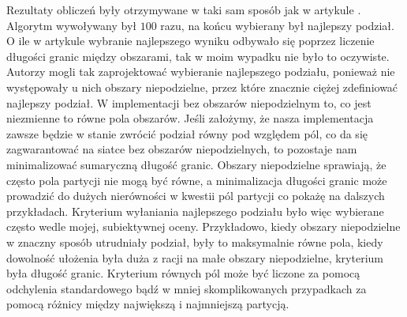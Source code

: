 Rezultaty obliczeń były otrzymywane w taki sam sposób jak w artykule \cite{1364754}.
Algorytm wywoływany był $100$ razu, na końcu wybierany był najlepszy podział.
O ile w artykule \cite{1364754} wybranie najlepszego wyniku odbywało się poprzez liczenie długości granic między obszarami,
tak w moim wypadku nie było to oczywiste.
Autorzy \cite{1364754} mogli tak zaprojektować wybieranie najlepszego podziału, ponieważ nie występowały u nich
obszary niepodzielne, przez które znacznie ciężej zdefiniować najlepszy podział.
W implementacji bez obszarów niepodzielnym to, co jest niezmienne to równe pola obszarów.
Jeśli założymy, że nasza implementacja zawsze będzie w stanie zwrócić podział równy pod względem pól,
co da się zagwarantować na siatce bez obszarów niepodzielnych, to pozostaje nam minimalizować sumaryczną długość granic.
Obszary niepodzielne sprawiają, że często pola partycji nie mogą być równe, a minimalizacja długości granic może
prowadzić do dużych nierówności w kwestii pól partycji co pokażę na dalszych przykładach.
Kryterium wyłaniania najlepszego podziału było więc wybierane często wedle mojej, subiektywnej oceny.
Przykładowo, kiedy obszary niepodzielne w znaczny sposób utrudniały podział, były to maksymalnie równe pola,
kiedy dowolność ułożenia była duża z racji na małe obszary niepodzielne, kryterium była długość granic.
Kryterium równych pól może być liczone za pomocą odchylenia standardowego bądź w mniej skomplikowanych przypadkach
za pomocą różnicy między największą i najmniejszą partycją.
